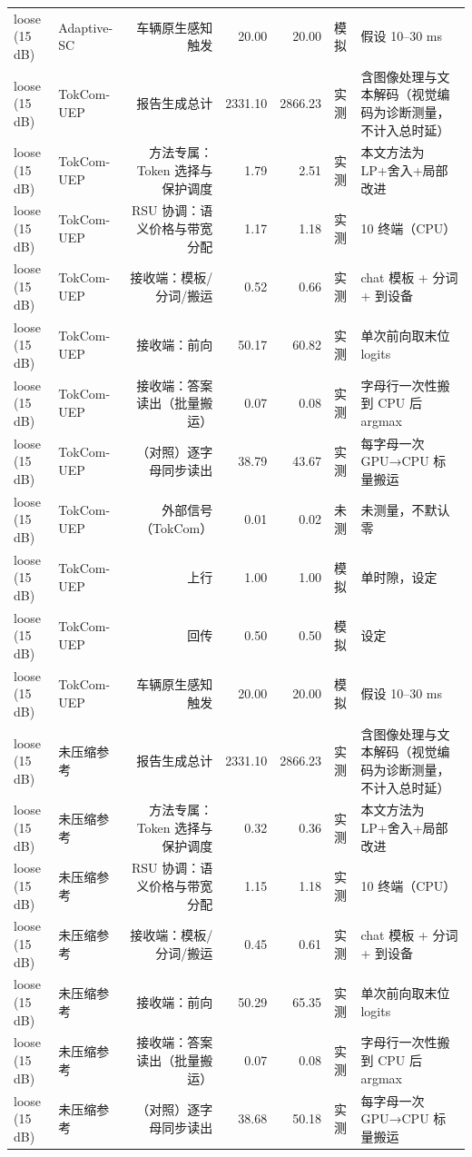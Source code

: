 \begin{tabular}{llrrrl}
loose (15 dB) & Adaptive-SC & 车辆原生感知触发 & 20.00 & 20.00 & 模拟 & 假设 10–30 ms\\
loose (15 dB) & TokCom-UEP & 报告生成总计 & 2331.10 & 2866.23 & 实测 & 含图像处理与文本解码（视觉编码为诊断测量，不计入总时延）\\
loose (15 dB) & TokCom-UEP & 方法专属：Token 选择与保护调度 & 1.79 & 2.51 & 实测 & 本文方法为 LP+舍入+局部改进\\
loose (15 dB) & TokCom-UEP & RSU 协调：语义价格与带宽分配 & 1.17 & 1.18 & 实测 & 10 终端（CPU）\\
loose (15 dB) & TokCom-UEP & 接收端：模板/分词/搬运 & 0.52 & 0.66 & 实测 & chat 模板 + 分词 + 到设备\\
loose (15 dB) & TokCom-UEP & 接收端：前向 & 50.17 & 60.82 & 实测 & 单次前向取末位 logits\\
loose (15 dB) & TokCom-UEP & 接收端：答案读出（批量搬运） & 0.07 & 0.08 & 实测 & 字母行一次性搬到 CPU 后 argmax\\
loose (15 dB) & TokCom-UEP & （对照）逐字母同步读出 & 38.79 & 43.67 & 实测 & 每字母一次 GPU→CPU 标量搬运\\
loose (15 dB) & TokCom-UEP & 外部信号（TokCom） & 0.01 & 0.02 & 未测 & 未测量，不默认零\\
loose (15 dB) & TokCom-UEP & 上行 & 1.00 & 1.00 & 模拟 & 单时隙，设定\\
loose (15 dB) & TokCom-UEP & 回传 & 0.50 & 0.50 & 模拟 & 设定\\
loose (15 dB) & TokCom-UEP & 车辆原生感知触发 & 20.00 & 20.00 & 模拟 & 假设 10–30 ms\\
loose (15 dB) & 未压缩参考 & 报告生成总计 & 2331.10 & 2866.23 & 实测 & 含图像处理与文本解码（视觉编码为诊断测量，不计入总时延）\\
loose (15 dB) & 未压缩参考 & 方法专属：Token 选择与保护调度 & 0.32 & 0.36 & 实测 & 本文方法为 LP+舍入+局部改进\\
loose (15 dB) & 未压缩参考 & RSU 协调：语义价格与带宽分配 & 1.15 & 1.18 & 实测 & 10 终端（CPU）\\
loose (15 dB) & 未压缩参考 & 接收端：模板/分词/搬运 & 0.45 & 0.61 & 实测 & chat 模板 + 分词 + 到设备\\
loose (15 dB) & 未压缩参考 & 接收端：前向 & 50.29 & 65.35 & 实测 & 单次前向取末位 logits\\
loose (15 dB) & 未压缩参考 & 接收端：答案读出（批量搬运） & 0.07 & 0.08 & 实测 & 字母行一次性搬到 CPU 后 argmax\\
loose (15 dB) & 未压缩参考 & （对照）逐字母同步读出 & 38.68 & 50.18 & 实测 & 每字母一次 GPU→CPU 标量搬运\\

\end{tabular}
